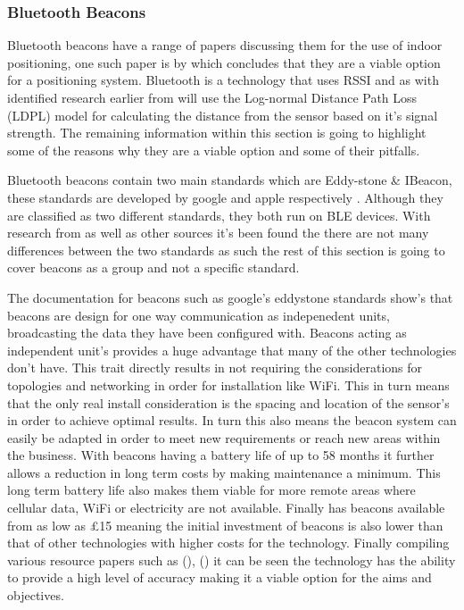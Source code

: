 \subsubsection{Bluetooth Beacons}
Bluetooth beacons have a range of papers discussing them for the use of indoor positioning, one such paper is by \cite{kingatua_2020_bluetooth} which concludes that they are a viable option for a positioning system. Bluetooth is a technology that uses RSSI and as  with identified research earlier from \cite{kontakt_ibeacon} will use the Log-normal Distance Path Loss (LDPL) model for calculating the distance from the sensor based on it's signal strength. The remaining information within this section is going to highlight some of the reasons why they are a viable option and some of their pitfalls. 

Bluetooth beacons contain two main standards which are Eddy-stone \& IBeacon, these standards are developed by google and apple respectively \cite{kontakt_ibeacon}. Although they are classified as two different standards, they both run on BLE devices. With research from \cite{kontakt_ibeacon} as well as other sources it's been found the there are not many differences between the two standards as such the rest of this section is going to cover beacons as a group and not a specific standard.

The documentation for beacons such as google's eddystone standards \cite{google_googleeddystone} show's that beacons are design for one way communication as indepenedent units, broadcasting the data they have been configured with. Beacons acting as independent unit's provides a huge advantage that many of the other technologies don't have. This trait directly results in not requiring the considerations for topologies and networking in order for installation like WiFi. This in turn means that the only real install consideration is the spacing and location of the sensor's in order to achieve optimal results. In turn this also means the beacon system can easily be adapted in order to meet new requirements or reach new areas within the business. With beacons having a battery life of up to 58 months \cite{beaconzone_2016_google} it further allows a reduction in long term costs by making maintenance a minimum. This long term battery life also makes them viable for more remote areas where cellular data, WiFi or electricity are not available. Finally \cite{beaconzone_2016_google} has beacons available from as low as £15 meaning the initial investment of beacons is also lower than that of other technologies with higher costs for the technology. Finally compiling various resource papers such as (\cite{zhuang_2016_smartphonebased}), (\cite{kingatua_2020_bluetooth}) it can be seen the technology has the ability to provide a high level of accuracy making it a viable option for the aims and objectives.

